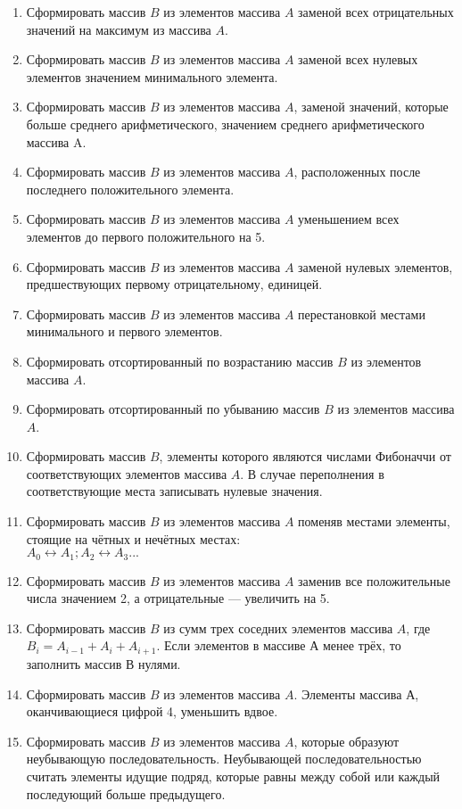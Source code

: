 \documentclass[a4paper, 12pt, oneside]{article}
\begin{document}
\begin{enumerate}
    \item Сформировать массив $B$ из элементов массива $A$ заменой всех отрицательных значений на максимум из массива $A$.
    \item Сформировать массив $B$ из элементов массива $A$ заменой всех нулевых элементов значением минимального элемента.
    \item Сформировать массив $B$ из элементов массива $A$, заменой значений, которые больше среднего арифметического, значением среднего арифметического массива A.
    \item Сформировать массив $B$ из элементов массива $A$, расположенных после последнего положительного элемента.
    \item Сформировать массив $B$ из элементов массива $A$ уменьшением всех элементов до первого положительного на 5.
    \item Сформировать массив $B$ из элементов массива $A$ заменой нулевых элементов, предшествующих первому отрицательному, единицей.
    \item Сформировать массив $B$ из элементов массива $A$ перестановкой местами минимального и первого элементов.
    \item Сформировать отсортированный по возрастанию массив $B$ из элементов массива $A$.
    \item Сформировать отсортированный по убыванию массив $B$ из элементов массива $A$.
    \item Сформировать массив $B$, элементы которого являются  числами Фибоначчи от соответствующих элементов массива $A$. В случае переполнения в соответствующие места записывать нулевые значения.
    \item Сформировать массив $B$ из элементов массива $A$ поменяв местами элементы, стоящие на чётных и нечётных местах: \\ $A_0 \leftrightarrow A_1; A_2 \leftrightarrow A_3 ... $
    \item Сформировать массив $B$ из элементов массива $A$ заменив все положительные числа значением 2, а отрицательные — увеличить на 5.
    \item Сформировать массив $B$ из сумм трех соседних элементов массива $A$, где $B_i = A_{i-1}+A_{i}+A_{i+1}$. Если элементов в массиве А менее трёх, то заполнить массив В нулями.
    \item Сформировать массив $B$ из элементов массива $A$. Элементы массива $А$, оканчивающиеся цифрой 4, уменьшить вдвое.
    \item Сформировать массив $B$ из элементов массива $A$, которые образуют неубывающую последовательность. Неубывающей последовательностью считать элементы идущие подряд, которые равны между собой или каждый последующий больше предыдущего.

\end{enumerate}
\end{document}
